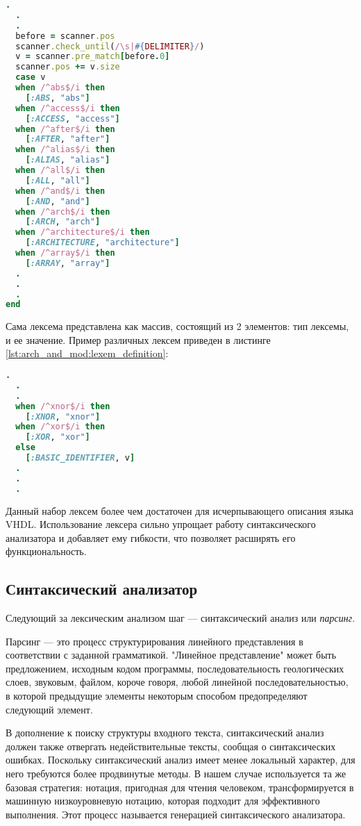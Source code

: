 \begin{lstlisting}[language=Ruby, style=rubystyle,caption={Проверка принадлежности части строки базовой конструкции языка}]
  .
  .
  .
  before = scanner.pos
  scanner.check_until(/\s|#{DELIMITER}/)
  v = scanner.pre_match[before.0]
  scanner.pos += v.size
  case v
  when /^abs$/i then
    [:ABS, "abs"]
  when /^access$/i then
    [:ACCESS, "access"]
  when /^after$/i then
    [:AFTER, "after"]
  when /^alias$/i then
    [:ALIAS, "alias"]
  when /^all$/i then
    [:ALL, "all"]
  when /^and$/i then
    [:AND, "and"]
  when /^arch$/i then
    [:ARCH, "arch"]
  when /^architecture$/i then
    [:ARCHITECTURE, "architecture"]
  when /^array$/i then
    [:ARRAY, "array"]
  .
  .
  .
end
\end{lstlisting}
Сама лексема представлена как массив, состоящий из 2 элементов: тип лексемы, и ее значение. Пример различных лексем приведен в листинге \ref{lst:arch_and_mod:lexem_definition}:
\begin{lstlisting}[language=Ruby, style=rubystyle,caption={Различные типы лексем}, label=lst:arch_and_mod:lexem_definition]
  .
  .
  .
  when /^xnor$/i then
    [:XNOR, "xnor"]
  when /^xor$/i then
    [:XOR, "xor"]
  else
    [:BASIC_IDENTIFIER, v]
  .
  .
  .
\end{lstlisting}

Данный набор лексем более чем достаточен для исчерпывающего описания языка VHDL. Использование лексера сильно упрощает работу синтаксического анализатора и добавляет ему гибкости, что позволяет расширять его функциональность.
\subsection{Синтаксический анализатор}
\label{sub:arch_and_mod:parser}
Следующий за лексическим анализом шаг --- синтаксический анализ или \textit{парсинг}.

Парсинг --- это процесс структурирования линейного представления в соответствии с заданной грамматикой. "Линейное представление" может быть предложением, исходным кодом программы, последовательность геологических слоев, звуковым, файлом, короче говоря, любой линейной последовательностью, в которой предыдущие элементы некоторым способом предопределяют следующий элемент.

В дополнение к поиску структуры входного текста, синтаксический анализ должен также отвергать недействительные тексты, сообщая о синтаксических ошибках. Поскольку синтаксический анализ имеет менее локальный характер, для него требуются более продвинутые методы. В нашем случае используется та же базовая стратегия: нотация, пригодная для чтения человеком, трансформируется в машинную низкоуровневую нотацию, которая подходит для эффективного выполнения. Этот процесс называется генерацией синтаксического анализатора.

